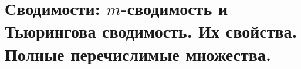 \section{Сводимости: $m$-сводимость и Тьюрингова сводимость. Их свойства. Полные перечислимые множества.}